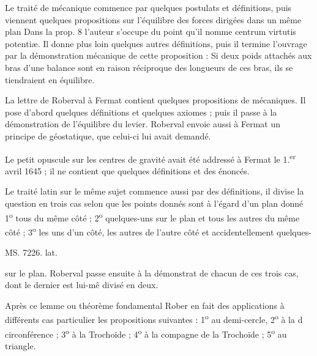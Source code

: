 \documentclass[11pt,a4paper]{article}
\begin{document}
Le traité de mécanique commence par quelques postulats
et définitions, puis viennent quelques propositions sur l'équilibre des forces dirigées dans un même plan
Dans la prop. 8 l'auteur s'occupe du point qu'il nomme
centrum virtutis potentiæ. Il donne plus loin quelques
autres définitions, puis il termine l'ouvrage par la démonstration mécanique de cette proposition : Si deux poids attachés aux bras d'une balance sont en raison réciproque des longueurs de ces bras, ils se tiendraient en équilibre.

La lettre de Roberval à Fermat contient quelques propositions de mécaniques. Il pose d'abord quelques
définitions et quelques axiomes ; puis il passe à la
démonstration de l'équilibre du levier. Roberval
envoie aussi à Fermat un principe de géostatique, que celui-ci lui avait demandé.

Le petit opuscule sur les centres de gravité avait été addressé à Fermat le 1.\textsuperscript{er} avril 1645 ; il ne contient que quelques définitions et des énoncés.

Le traité latin sur le même sujet commence aussi par des définitions, il divise la question en trois cas selon que les points donnés sont à l'égard d'un plan donné 1\textsuperscript{o} tous du même côté ; 2\textsuperscript{o} quelques-uns sur le plan et tous les autres du même côté ; 3\textsuperscript{o} les uns d'un côté, les autres de l'autre côté et accidentellement quelques-


MS. 7226. lat.

sur le plan. Roberval passe ensuite à la démonstrat de chacun de ces trois cas, dont le dernier est lui-mê divisé en deux.

Après ce lemme ou théorème fondamental Rober en fait des applications à différents cas particulier\ill{} les propositions suivantes : 1\textsuperscript{o} au demi-cercle, 2\textsuperscript{o} à la d\ill{}
circonférence ; 3\textsuperscript{o} à la Trochoïde ; 4\textsuperscript{o} à la compagne de la
Trochoïde ; 5\textsuperscript{o} au triangle.
\end{document}
